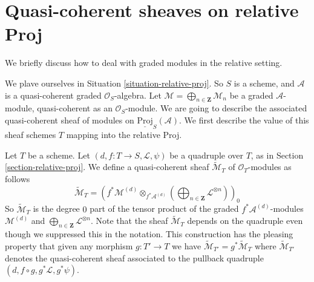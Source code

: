 \section{Quasi-coherent sheaves on relative Proj}
\label{section-quasi-coherent-relative-proj}

\noindent
We briefly discuss how to deal with graded modules in the relative
setting.

\medskip\noindent
We plave ourselves in Situation \ref{situation-relative-proj}.
So $S$ is a scheme, and
$\mathcal{A}$ is a quasi-coherent graded $\mathcal{O}_S$-algebra.
Let $\mathcal{M} = \bigoplus_{n \in \mathbf{Z}} \mathcal{M}_n$
be a graded $\mathcal{A}$-module, quasi-coherent as an $\mathcal{O}_S$-module.
We are going to describe the associated quasi-coherent sheaf
of modules on $\underline{\text{Proj}}_S(\mathcal{A})$.
We first describe the value of this sheaf schemes $T$ mapping
into the relative Proj.

\medskip\noindent
Let $T$ be a scheme. Let $(d, f : T \to S, \mathcal{L}, \psi)$
be a quadruple over $T$, as in Section \ref{section-relative-proj}.
We define a quasi-coherent sheaf
$\widetilde{\mathcal{M}}_T$ of $\mathcal{O}_T$-modules
as follows
\begin{equation}
\label{equation-widetilde-M}
\widetilde{\mathcal{M}}_T =
\left(
f^*\mathcal{M}^{(d)}
\otimes_{f^*\mathcal{A}^{(d)}}
\left(\bigoplus\nolimits_{n \in \mathbf{Z}} \mathcal{L}^{\otimes n}\right)
\right)_0
\end{equation}
So $\widetilde{\mathcal{M}}_T$ is the degree $0$ part
of the tensor product of the graded $f^*\mathcal{A}^{(d)}$-modules
$\mathcal{M}^{(d)}$ and
$\bigoplus\nolimits_{n \in \mathbf{Z}} \mathcal{L}^{\otimes n}$.
Note that the sheaf $\widetilde{\mathcal{M}}_T$ depends on the quadruple
even though we suppressed this in the notation.
This construction has the pleasing property that
given any morphism $g : T' \to T$ we have
$\widetilde{\mathcal{M}}_{T'} = g^*\widetilde{\mathcal{M}}_T$
where $\widetilde{\mathcal{M}}_{T'}$ denotes the quasi-coherent
sheaf associated to the pullback quadruple
$(d, f \circ g, g^*\mathcal{L}, g^*\psi)$.

